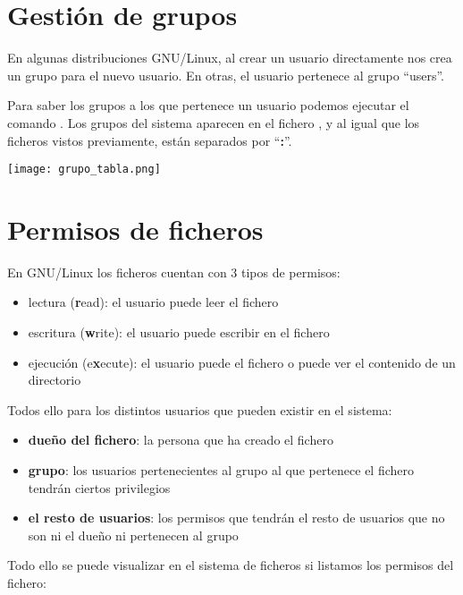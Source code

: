 \section{Gestión de grupos}
En algunas distribuciones GNU/Linux, al crear un usuario directamente nos crea un grupo para el nuevo usuario. En otras, el usuario pertenece al grupo “users”.

Para saber los grupos a los que pertenece un usuario podemos ejecutar el comando . Los grupos del sistema aparecen en el fichero , y al igual que los ficheros vistos previamente, están separados por “\textbf{:}”.

\begin{center}
  \texttt{[image: grupo\_tabla.png]}
\end{center}

\section{Permisos de ficheros}
En GNU/Linux los ficheros cuentan con 3 tipos de permisos:
\begin{itemize}
    \item lectura (\textbf{r}ead): el usuario puede leer el fichero
    \item escritura (\textbf{w}rite): el usuario puede escribir en el fichero
    \item ejecución (e\textbf{x}ecute): el usuario puede el fichero o puede ver el contenido de un directorio
\end{itemize}


Todos ello para los distintos usuarios que pueden existir en el sistema:
\begin{itemize}
    \item \textbf{dueño del fichero}: la persona que ha creado el fichero
    \item \textbf{grupo}: los usuarios pertenecientes al grupo al que pertenece el fichero tendrán ciertos privilegios
    \item \textbf{el resto de usuarios}: los permisos que tendrán el resto de usuarios que no son ni el dueño ni pertenecen al grupo
\end{itemize}

Todo ello se puede visualizar en el sistema de ficheros si listamos los permisos del fichero:


